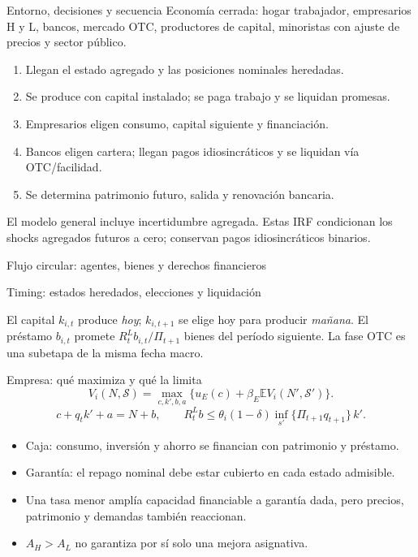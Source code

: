 \documentclass[aspectratio=169,11pt]{beamer}
\begin{document}
\begin{frame}{Entorno, decisiones y secuencia}
Economía cerrada: hogar trabajador, empresarios H y L, bancos, mercado OTC,
productores de capital, minoristas con ajuste de precios y sector público.
\begin{enumerate}
\item Llegan el estado agregado y las posiciones nominales heredadas.
\item Se produce con capital instalado; se paga trabajo y se liquidan promesas.
\item Empresarios eligen consumo, capital siguiente y financiación.
\item Bancos eligen cartera; llegan pagos idiosincráticos y se liquidan vía OTC/facilidad.
\item Se determina patrimonio futuro, salida y renovación bancaria.
\end{enumerate}
El modelo general incluye incertidumbre agregada. Estas IRF condicionan los
shocks agregados futuros a cero; conservan pagos idiosincráticos binarios.
\end{frame}

\begin{frame}{Flujo circular: agentes, bienes y derechos financieros}
\centering
\resizebox{.94\linewidth}{!}{}
\end{frame}

\begin{frame}{Timing: estados heredados, elecciones y liquidación}
\centering
\resizebox{\linewidth}{!}{}

\medskip
\small
El capital $k_{i,t}$ produce \emph{hoy}; $k_{i,t+1}$ se elige hoy para
producir \emph{mañana}. El préstamo $b_{i,t}$ promete
$R_t^L b_{i,t}/\Pi_{t+1}$ bienes del período siguiente.
La fase OTC es una subetapa de la misma fecha macro.
\end{frame}

\begin{frame}{Empresa: qué maximiza y qué la limita}
\[
V_i(N,\mathcal S)=\max_{c,k',b,a}\{u_E(c)+\beta_E\mathbb E V_i(N',\mathcal S')\}.
\]
\[
c+q_t k'+a=N+b,\qquad
R^L_t b\leq\theta_i(1-\delta)\inf_{s'}\{\Pi_{t+1}q_{t+1}\}\,k'.
\]
\begin{itemize}
\item Caja: consumo, inversión y ahorro se financian con patrimonio y préstamo.
\item Garantía: el repago nominal debe estar cubierto en cada estado admisible.
\item Una tasa menor amplía capacidad financiable a garantía dada, pero precios,
patrimonio y demandas también reaccionan.
\item $A_H>A_L$ no garantiza por sí solo una mejora asignativa.
\end{itemize}
\end{frame}
\end{document}
